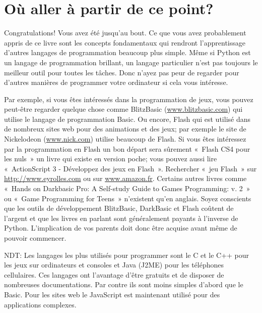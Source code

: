 


\chapter{Où aller à partir de ce point?}

Congratulations! Vous avez été jusqu'au bout. Ce que vous avez probablement appris de ce livre sont les concepts fondamentaux qui rendront l'apprentissage d'autres langages de programmation beaucoup plus simple. Même si Python est un langage de programmation brillant, un langage particulier n'est pas toujours le meilleur outil pour toutes les tâches. Donc n'ayez pas peur de regarder pour d'autres manières de programmer votre ordinateur si cela vous intéresse.

Par exemple, si vous êtes intéressés dans la programmation de jeux, vous pouvez peut-être regarder quelque chose comme BlitzBasic (\url{www.blitzbasic.com}) qui utilise le langage de programmation Basic. Ou encore, Flash qui est utilisé dans de nombreux sites web pour des animations et des jeux; par exemple le site de Nickelodeon (\url{www.nick.com}) utilise  beaucoup de Flash. Si vous êtes intéressez par la programmation en Flash un bon départ sera sûrement «~Flash CS4 pour les nuls~» un livre qui existe en version poche; vous pouvez aussi lire «~ActionScript 3 - Développez des jeux en Flash~». Rechercher «~jeu Flash~» sur \url{http://www.eyrolles.com} ou sur \url{www.amazon.fr}. Certains autres livres comme «~Hands on Darkbasic Pro: A Self-study Guide to Games Programming: v. 2~» ou «~Game Programming for Teens~» n'existent qu'en anglais.
Soyez conscients que les outils de développement BlitzBasic, DarkBasic et Flash coûtent de l'argent et que les livres en parlant sont généralement payants à l'inverse de Python. L'implication de vos parents doit donc être acquise avant même de pouvoir commencer.

NDT: Les langages les plus utilisés pour programmer sont le C et le C++ pour les jeux sur ordinateurs et consoles et Java (J2ME) pour les téléphones cellulaires. Ces langages ont l'avantage d'être gratuits et de disposer de nombreuses documentations. Par contre ils sont moins simples d'abord que le Basic. Pour les sites web le JavaScript est maintenant utilisé pour des applications complexes.


